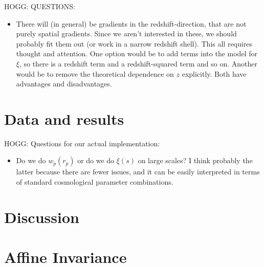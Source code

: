 \documentclass[12pt, letterpaper]{article}
\begin{document}
HOGG: QUESTIONS:
\begin{itemize}
\item There will (in general) be gradients in the redshift-direction, that are
not purely spatial gradients. Since we aren't interested in these, we should
probably fit them out (or work in a narrow redshift shell). This all requires
thought and attention. One option would be to add terms into the model for $\xi$,
so there is a redshift term and a redshift-squared term and so on. Another would
be to remove the theoretical dependence on $z$ explicitly. Both have advantages
and disadvantages.
\end{itemize}

\section{Data and results}

HOGG: Questions for our actual implementation:
\begin{itemize}
\item Do we do $w_p(r_p)$ or do we do $\xi(s)$ on large scales? I think probably
the latter because there are fewer issues, and it can be easily interpreted in terms
of standard cosmological parameter combinations.
\end{itemize}

\section{Discussion}

\appendix
\section{Affine Invariance}
\end{document}
